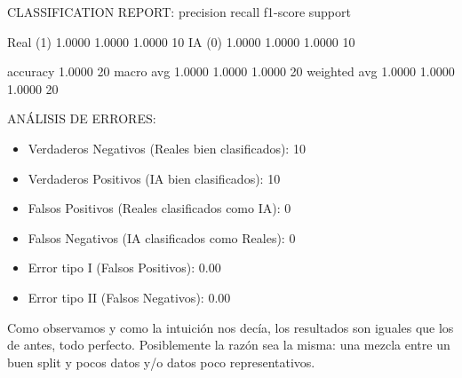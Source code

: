 CLASSIFICATION REPORT:
              precision    recall  f1-score   support

    Real (1)     1.0000    1.0000    1.0000        10
      IA (0)     1.0000    1.0000    1.0000        10

    accuracy                         1.0000        20
   macro avg     1.0000    1.0000    1.0000        20
weighted avg     1.0000    1.0000    1.0000        20


ANÁLISIS DE ERRORES:
\begin{itemize}
	\item Verdaderos Negativos (Reales bien clasificados): 10
	\item Verdaderos Positivos (IA bien clasificados): 10
	\item Falsos Positivos (Reales clasificados como IA): 0
	\item Falsos Negativos (IA clasificados como Reales): 0
	\item Error tipo I (Falsos Positivos): 0.00%
	\item Error tipo II (Falsos Negativos): 0.00%
\end{itemize}

Como observamos y como la intuición nos decía, los resultados son iguales que los de antes, todo perfecto. Posiblemente la razón sea la misma: una mezcla entre un buen split y pocos datos y/o datos poco representativos.